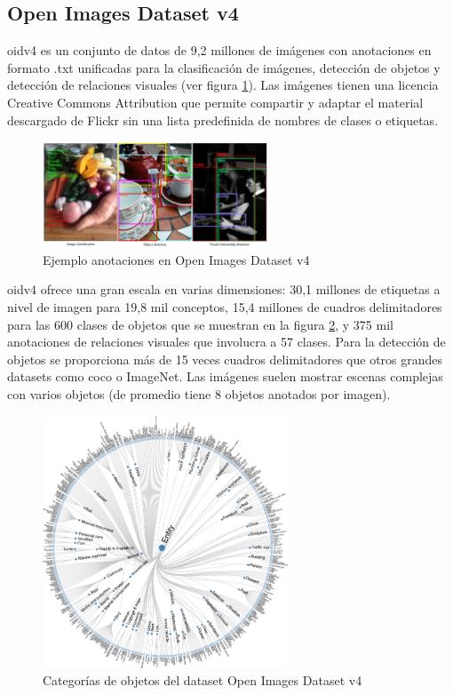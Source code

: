 \subsection{Open Images Dataset v4}
\label{subsec:OIDv4-dataset}

\gls{oidv4} \cite{Kuznetsova_2020} es un conjunto de datos de 9,2 millones de imágenes con anotaciones en formato .txt unificadas para la clasificación de imágenes, detección de objetos y detección de relaciones visuales (ver figura \ref{fig:example-annotations-oidv4}). Las imágenes tienen una licencia Creative Commons Attribution que permite compartir y adaptar el material descargado de Flickr sin una lista predefinida de nombres de clases o etiquetas.

\begin{figure}[ht]
\centering
\includegraphics[width=0.6\textwidth]{img/chapters/desarrollo/example-annotations-oidv4.jpg}
\caption{\label{fig:example-annotations-oidv4}Ejemplo anotaciones en Open Images Dataset v4 \cite{Kuznetsova_2020}}
\end{figure}

\gls{oidv4} ofrece una gran escala en varias dimensiones: 30,1 millones de etiquetas a nivel de imagen para 19,8 mil conceptos, 15,4 millones de cuadros delimitadores para las 600 clases de objetos que se muestran en la figura \ref{fig:oidv4dataset}, y 375 mil anotaciones de relaciones visuales que involucra a 57 clases. Para la detección de objetos se proporciona más de 15 veces cuadros delimitadores que otros grandes datasets como \gls{coco} o ImageNet. Las imágenes suelen mostrar escenas complejas con varios objetos (de promedio tiene 8 objetos anotados por imagen). 

\begin{figure}[ht]
\centering
\includegraphics[width=0.65\textwidth]{img/chapters/desarrollo/oidv4-classes.png}
\caption{\label{fig:oidv4dataset}Categorías de objetos del dataset Open Images Dataset v4 \cite{Kuznetsova_2020}}
\end{figure}

